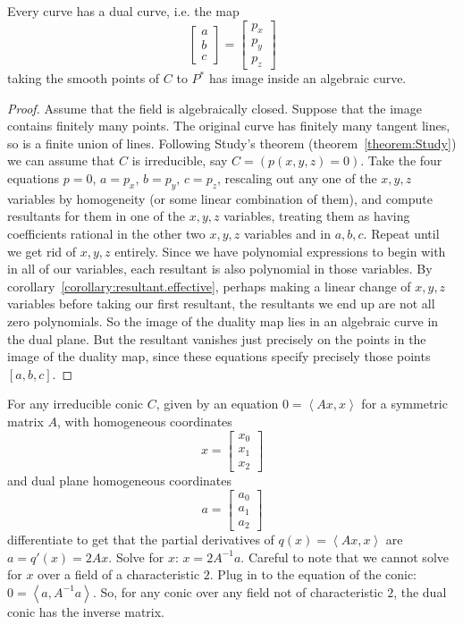 \begin{corollary}
Every curve has a dual curve, i.e. the map
\[
\begin{bmatrix}
a \\
b \\
c
\end{bmatrix}
=
\begin{bmatrix}
p_x \\
p_y \\
p_z
\end{bmatrix}
\]
taking the smooth points of \(C\) to \(P^*\) has image inside an algebraic curve.
\end{corollary}
\begin{proof}
Assume that the field is algebraically closed.
Suppose that the image contains finitely many points.
The original curve has finitely many tangent lines, so is a finite union of lines. 
Following Study's theorem (theorem~\vref{theorem:Study}) we can assume that \(C\) is irreducible, say \(C=(p(x,y,z)=0)\). 
Take the four equations \(p=0\), \(a=p_x\), \(b=p_y\), \(c=p_z\), rescaling out any one of the \(x,y,z\) variables by homogeneity (or some linear combination of them), and compute resultants for them in one of the \(x,y,z\) variables, treating them as having coefficients rational in the other two \(x,y,z\) variables and in \(a,b,c\). Repeat until we get rid of \(x,y,z\) entirely. Since we have polynomial expressions to begin with in all of our variables, each resultant is also polynomial in those variables. By corollary~\vref{corollary:resultant.effective}, perhaps making a linear change of \(x,y,z\) variables before taking our first resultant, the resultants we end up are not all zero polynomials. 
So the image of the duality map lies in an algebraic curve in the dual plane. But the resultant vanishes just precisely on the points in the image of the duality map, since these equations specify precisely those points \([a,b,c]\).
\end{proof}

\begin{example}
For any irreducible conic \(C\), given by an equation \(0=\left<Ax,x\right>\) for a symmetric matrix \(A\), with homogeneous coordinates
\[
x=
\begin{bmatrix}
x_0\\
x_1\\
x_2
\end{bmatrix}
\]
and dual plane homogeneous coordinates
\[
a=
\begin{bmatrix}
a_0\\
a_1\\
a_2
\end{bmatrix}
\]
differentiate to get that the partial derivatives of \(q(x)=\left<Ax,x\right>\) are \(a=q'(x)=2Ax\).
Solve for \(x\): \(x=2A^{-1}a\).
Careful to note that we cannot solve for \(x\) over a field of a characteristic \(2\).
Plug in to the equation of the conic: \(0=\left<a,A^{-1}a\right>\).
So, for any conic over any field not of characteristic \(2\), the dual conic has the inverse matrix.
\end{example}

